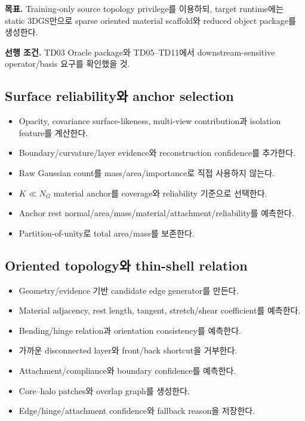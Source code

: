 \documentclass[10pt,a4paper]{article}
\newcommand{\todo}{\textcolor{TodoGray}{\(\square\)}}
\begin{document}
\textbf{목표.}
Training-only source topology privilege를 이용하되, target runtime에는 static 3DGS만으로 sparse oriented material scaffold와 reduced object package를 생성한다.

\textbf{선행 조건.}
TD03 Oracle package와 TD05--TD11에서 downstream-sensitive operator/basis 요구를 확인했을 것.

\subsection*{Surface reliability와 anchor selection}

\begin{itemize}
  \item[\todo] Opacity, covariance surface-likeness, multi-view contribution과 isolation feature를 계산한다.
  \item[\todo] Boundary/curvature/layer evidence와 reconstruction confidence를 추가한다.
  \item[\todo] Raw Gaussian count를 mass/area/importance로 직접 사용하지 않는다.
  \item[\todo] \(K\ll N_G\) material anchor를 coverage와 reliability 기준으로 선택한다.
  \item[\todo] Anchor rest normal/area/mass/material/attachment/reliability를 예측한다.
  \item[\todo] Partition-of-unity로 total area/mass를 보존한다.
\end{itemize}

\subsection*{Oriented topology와 thin-shell relation}

\begin{itemize}
  \item[\todo] Geometry/evidence 기반 candidate edge generator를 만든다.
  \item[\todo] Material adjacency, rest length, tangent, stretch/shear coefficient를 예측한다.
  \item[\todo] Bending/hinge relation과 orientation consistency를 예측한다.
  \item[\todo] 가까운 disconnected layer와 front/back shortcut을 거부한다.
  \item[\todo] Attachment/compliance와 boundary confidence를 예측한다.
  \item[\todo] Core--halo patches와 overlap graph를 생성한다.
  \item[\todo] Edge/hinge/attachment confidence와 fallback reason을 저장한다.
\end{itemize}
\end{document}
